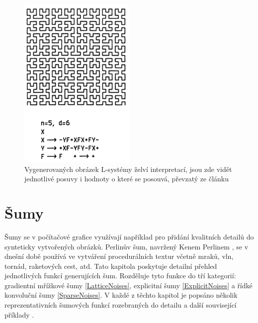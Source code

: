 \begin{figure}[H]
	\centering
	\includegraphics[scale=1]{obrazky-figures/L-system.png}
	\caption[L-system]{Vygenerovaných obrázek L-systémy želví interpretací, jsou zde vidět jednotlivé posuvy i hodnoty o které se posouvá, převzatý ze článku\footnotemark}
\end{figure}

\newpage

\section{Šumy}
\label{noise}
Šumy se v počítačové grafice využívají například pro přidání kvalitních detailů do synteticky vytvořených obrázků. Perlinův šum, navržený Kenem Perlinem \cite{PerlinKen}, se v dnešní době používá ve vytváření procedurálních textur včetně mraků, vln, tornád, raketových cest, atd. Tato kapitola poskytuje detailní přehled jednotlivých funkcí generujících šum. Rozděluje tyto funkce do tří kategorií: gradientní mřížkové šumy \ref{LatticeNoises}, explicitní šumy \ref{ExplicitNoises} a řídké konvoluční šumy \ref{SparseNoises}. V každé z těchto kapitol je popsáno několik reprezentativních šumových funkcí rozebraných do detailu a další související příklady \cite{Lagae10}. 

